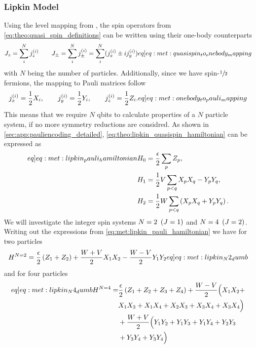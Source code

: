 \subsubsection{Lipkin Model}
Using the level mapping from \citep{hlatshwayoSimulatingExcitedStates2022}, the spin operators from \cref{eq:theo:quasi_spin_definitions} can be written using their one-body counterparts 
\begin{align}
    J_z = \sum_{i}^{N} \spinsmall{z}{i} \hspace{20px} J_\pm = \sum_i^N \spinsmall{\pm}{i} = \sum_i^N (\spinsmall{x}{i}\pm i\spinsmall{y}{i}) \label[eq]{eq:met:quasispin_to_onebody_mapping}
\end{align}
with $N$ being the number of particles. Additionally, since we have spin-$\sfrac{1}{2}$ fermions, the mapping to Pauli matrices follow
\begin{align}
    \spinsmall{x}{i} = \frac{1}{2}X_i,\hspace{20px}\spinsmall{y}{i} = \frac{1}{2}Y_i,\hspace{20px}\spinsmall{z}{i} = \frac{1}{2}Z_i. \label[eq]{eq:met:onebody_to_pauli_mapping}
\end{align}
This means that we require $N$ qbits to calculate properties of a $N$ particle system, if no more symmetry reductions are considred. As shown in \cref{sec:app:pauliencoding_detailed}, \cref{eq:theo:lipkin_quasispin_hamiltonian} can be expressed as
\begin{align}
    \begin{split}\label[eq]{eq:met:lipkin_pauli_hamiltonian} 
        H_0 &= \frac{\epsilon}{2}\sum_{p}Z_p,  \\
        H_1 &= \frac{1}{2}V \sum_{p < q} X_p X_q - Y_p Y_q, \\
        H_2 &= \frac{1}{2}W \sum_{p < q} \pclosed{ X_p X_q + Y_p Y_q }. 
    \end{split}
\end{align}
We will investigate the integer spin systems $N=2\hspace{5px}(J=1)$ and $N=4\hspace{5px}(J=2)$. Writing out the expressions from \cref{eq:met:lipkin_pauli_hamiltonian} we have for two particles
\begin{align}
    H^{N=2} = \frac{\epsilon}{2}\pclosed{Z_1 + Z_2} + \frac{W+V}{2} X_1 X_2 - \frac{W-V}{2} Y_1 Y_2 \label[eq]{eq:met:lipkin_N2_dumb}
\end{align}
and for four particles
\begin{align}
    \begin{split} \label[eq]{eq:met:lipkin_N4_dumb}
        H^{N=4} =& \frac{\epsilon}{2}\pclosed{Z_1 + Z_2 + Z_3 + Z_4} + \frac{W-V}{2}\Big( X_1 X_2 +\\ 
        & X_1 X_3 + X_1 X_4 + X_2 X_3 + X_3 X_4 + X_3 X_4
        \Big) \\
        &+ \frac{W+V}{2}\Big( Y_1 Y_2 + Y_1 Y_3 + Y_1 Y_4 + Y_2 Y_3 \\
        & + Y_3 Y_4 + Y_3 Y_4\Big)
    \end{split}
\end{align}
